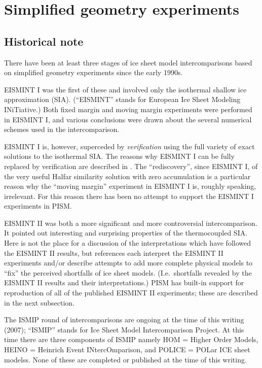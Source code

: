 \documentclass[11pt,final]{amsart}
\begin{document}
\clearpage\newpage
\section{Simplified geometry experiments}\label{sect:simp}

\subsection{Historical note}  There have been at least three stages of ice sheet model intercomparisons based on simplified geometry experiments since the early 1990s.

EISMINT I \cite{EISMINT96} was the first of these and involved only the isothermal shallow ice approximation (SIA).  (``EISMINT'' stands for European Ice Sheet Modeling INiTiative.)  Both fixed margin and moving margin experiments were performed in EISMINT I, and various conclusions were drawn about the several numerical schemes used in the intercomparison.  

EISMINT I is, however, superceded by \emph{verification} using the full variety of exact solutions to the isothermal SIA.  The reasons why EISMINT I can be fully replaced by verification are described in \cite{BLKCB}.  The ``rediscovery'', since EISMINT I, of the very useful Halfar similarity solution with zero accumulation \cite{Halfar83} is a particular reason why the ``moving margin'' experiment in EISMINT I is, roughly speaking, irrelevant.  For this reason there has been no attempt to support the EISMINT I experiments in PISM.

EISMINT II \cite{EISMINT00} was both a more significant and more controversial intercomparison.  It pointed out interesting and surprising properties of the thermocoupled SIA.  Here is not the place for a discussion of the interpretations which have followed the EISMINT II results, but references \cite{BBL,Hindmarsh04,Hindmarsh06,PayneBaldwin,SaitoEISMINT} each interpret the EISMINT II experiments and/or describe attempts to add more complete physical models to ``fix'' the perceived shortfalls of ice sheet models.   (I.e.~shortfalls revealed by the EISMINT II results and their interpretations.)  PISM has built-in support for reproduction of all of the published EISMINT II experiments; these are described in the next subsection.

The ISMIP round of intercomparisons are ongoing at the time of this writing (2007); ``ISMIP'' stands for Ice Sheet Model Intercomparison Project.  At this time there are three components of ISMIP namely HOM = Higher Order Models, HEINO = Heinrich Event INtercOmparison, and POLICE = POLar ICE sheet modelss.  None of these are completed or published at the time of this writing.
\end{document}
